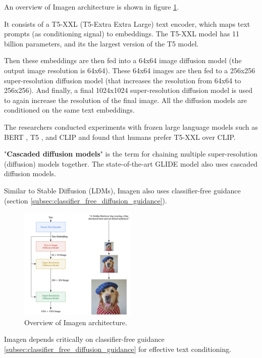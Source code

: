 An overview of Imagen architecture is shown in figure \ref{fig:imagen_architecture}.

It consists of a T5-XXL (T5-Extra Extra Large) text encoder, which maps text prompts (as conditioning signal) to embeddings. The T5-XXL model has 11 billion parameters, and its the largest version of the T5 model.

Then these embeddings are then fed into a 64x64 image diffusion model (the output image resolution is 64x64). These 64x64 images are then fed to a 256x256 super-resolution diffusion model (that increases the resolution from 64x64 to 256x256). And finally, a final 1024x1024 super-resolution diffusion model is used to again increase the resolution of the final image. All the diffusion models are conditioned on the same text embeddings.

The researchers conducted experiments with frozen large language models such as BERT \cite{bert}, T5 \cite{t5_model}, and CLIP \cite{openai_clip} and found that humans prefer T5-XXL over CLIP.

"\textbf{Cascaded diffusion models}" is the term for chaining multiple super-resolution (diffusion) models together. The state-of-the-art GLIDE \cite{glide} model also uses cascaded diffusion models.

Similar to Stable Diffusion (LDMs), Imagen also uses classifier-free guidance \cite{classifier_free_guidance} (section \ref{subsec:classifier_free_diffusion_guidance}).

\begin{figure}
    \centering
    \includegraphics[width=0.5\textwidth]{images/imagen/architecture.png}
    \caption{Overview of Imagen architecture.}
    \label{fig:imagen_architecture}
\end{figure}

Imagen depends critically on classifier-free guidance \ref{subsec:classifier_free_diffusion_guidance} for effective text conditioning.







